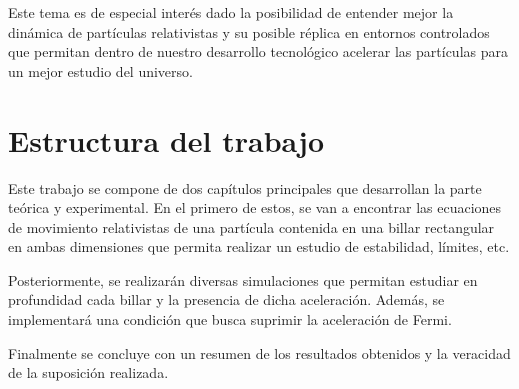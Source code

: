\vspace{3mm}

Este tema es de especial interés dado la posibilidad de entender mejor la dinámica de partículas relativistas y su posible réplica en entornos controlados que permitan dentro de nuestro desarrollo tecnológico acelerar las partículas para un mejor estudio del universo. 

\section{Estructura del trabajo}

Este trabajo se compone de dos capítulos principales que desarrollan la parte teórica y experimental. En el primero de estos, se van a encontrar las ecuaciones de movimiento relativistas de una partícula contenida en una billar rectangular en ambas dimensiones que permita realizar un estudio de estabilidad, límites, etc.

\vspace{3mm}

Posteriormente, se realizarán diversas simulaciones que permitan estudiar en profundidad cada billar y la presencia de dicha aceleración. Además, se implementará una condición que busca suprimir la aceleración de Fermi. 

\vspace{3mm}

Finalmente se concluye con un resumen de los resultados obtenidos y la veracidad de la suposición realizada.

%